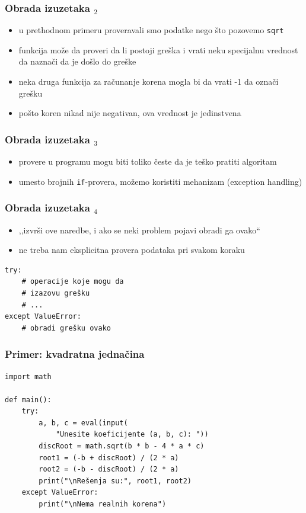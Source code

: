 \documentclass[utf8,compress,aspectratio=169]{beamer}
\begin{document}
\begin{frame}[fragile]
  \frametitle{Obrada izuzetaka $_2$}
  \begin{itemize}
    \item u prethodnom primeru proveravali smo podatke  nego što pozovemo \texttt{sqrt}
    \item funkcija može da proveri da li postoji greška i vrati neku specijalnu vrednost da naznači da je došlo do greške
    \item neka druga funkcija za računanje korena mogla bi da vrati -1 da označi grešku
    \item pošto koren nikad nije negativan, ova vrednost je jedinstvena
  \end{itemize}
\end{frame}

\begin{frame}[fragile]
  \frametitle{Obrada izuzetaka $_3$}
  \begin{itemize}
    \item provere u programu mogu biti toliko česte da je teško pratiti algoritam
    \item umesto brojnih \texttt{if}-provera, možemo koristiti mehanizam  (exception handling)
  \end{itemize}
\end{frame}

\begin{frame}[fragile]
  \frametitle{Obrada izuzetaka $_4$}
  \begin{itemize}
    \item ,,izvrši ove naredbe, i ako se neki problem pojavi obradi ga ovako``
    \item ne treba nam eksplicitna provera podataka pri svakom koraku
  \end{itemize}
\begin{verbatim}
try:
    # operacije koje mogu da
    # izazovu grešku
    # ...
except ValueError:
    # obradi grešku ovako
\end{verbatim}
\end{frame}

\begin{frame}[fragile]
  \frametitle{Primer: kvadratna jednačina}
\begin{verbatim}
import math

def main():
    try:
        a, b, c = eval(input(
            "Unesite koeficijente (a, b, c): "))
        discRoot = math.sqrt(b * b - 4 * a * c)
        root1 = (-b + discRoot) / (2 * a)
        root2 = (-b - discRoot) / (2 * a)
        print("\nRešenja su:", root1, root2)
    except ValueError:
        print("\nNema realnih korena")
\end{verbatim}
\end{frame}
\end{document}

